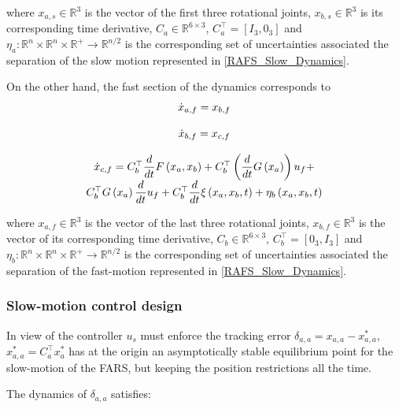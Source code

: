 \documentclass[journal,twocolumn]{IEEEtran}
\begin{document}
\noindent where ${x}_{a,s} \in \mathbb{R}^{3}$ is the vector of the first three rotational joints, $x_{b,s} \in \mathbb{R}^{3}$ is its corresponding time derivative, $C_{a} \in \mathbb{R}^{6 \times 3}$, $C_{a}^{\top}= [I_{3}, 0_{3}]$ and  $\eta_{a} : \mathbb{R}^{n} \times \mathbb{R}^{n} \times \mathbb{R}^{+} \rightarrow \mathbb{R}^{n/2 }$ is the corresponding set of uncertainties associated the separation of the slow motion represented in \eqref{RAFS_Slow_Dynamics}.

On the other hand, the fast section of the dynamics corresponds to %
\begin{equation}
\begin{array}{c}
\dot{x}_{a,f}=x_{b,f} \\ 
\\
\dot{x}_{b,f}=x_{c,f} \\ 
\\
\dot{x}_{c,f}=C^{\top}_{b} \dfrac{d}{dt} F \left( x_{a},x_{b}\right) + C^{\top}_{b} \left( \dfrac{d}{%
dt}G\left( x_{a}\right) \right) u_{f} + \\
C^{\top}_{b} G\left( x_{a}\right) \dfrac{d}{dt}%
u_{f}+ C^{\top}_{b} \dfrac{d}{dt} \xi \left( x_{a},x_{b},t\right) + \eta_{b}\left( x_{a},x_{b},t\right)
\end{array}%
\label{RAFS_Slow_Dynamics}
\end{equation}

\noindent where ${x}_{a,f} \in \mathbb{R}^{3}$ is the vector of the last three rotational joints, $x_{b,f} \in \mathbb{R}^{3}$ is the vector of its corresponding time derivative, $C_{b} \in \mathbb{R}^{6 \times 3}$, $C_{b}^{\top}= [0_{3}, I_{3}]$ and  $\eta_{b} : \mathbb{R}^{n} \times \mathbb{R}^{n} \times \mathbb{R}^{+} \rightarrow \mathbb{R}^{n/2 }$ is the corresponding set of uncertainties associated the separation of the fast-motion represented in \eqref{RAFS_Slow_Dynamics}.

\subsubsection{Slow-motion control design}

In view of the controller $u_{s}$ must enforce the tracking error $\delta_{a,a}=x_{a,a} - {x}^{*}_{a,a}$, ${x}^{*}_{a,a} = C_{a}^{\top} {x}^{*}_{a}$ has at the origin an asymptotically stable equilibrium point for the slow-motion of the FARS, but keeping the position restrictions all the time. 

The dynamics of $\delta_{a,a}$ satisfies:
%
%
%
%
%
\end{document}
